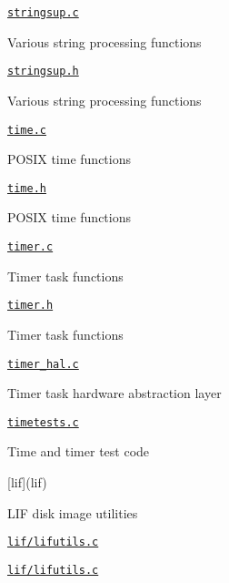\begin{DoxyItemize}
\begin{DoxyItemize}
\item \href{lib/stringsup.c}{\tt stringsup.\+c}
\begin{DoxyItemize}
\item Various string processing functions
\end{DoxyItemize}
\item \href{lib/stringsup.h}{\tt stringsup.\+h}
\begin{DoxyItemize}
\item Various string processing functions
\end{DoxyItemize}
\item \href{lib/time.c}{\tt time.\+c}
\begin{DoxyItemize}
\item P\+O\+S\+IX time functions
\end{DoxyItemize}
\item \href{lib/time.h}{\tt time.\+h}
\begin{DoxyItemize}
\item P\+O\+S\+IX time functions
\end{DoxyItemize}
\item \href{lib/timer.c}{\tt timer.\+c}
\begin{DoxyItemize}
\item Timer task functions
\end{DoxyItemize}
\item \href{lib/timer.h}{\tt timer.\+h}
\begin{DoxyItemize}
\item Timer task functions
\end{DoxyItemize}
\item \href{lib/timer_hal.c}{\tt timer\+\_\+hal.\+c}
\begin{DoxyItemize}
\item Timer task hardware abstraction layer
\end{DoxyItemize}
\item \href{lib/timetests.c}{\tt timetests.\+c}
\begin{DoxyItemize}
\item Time and timer test code
\end{DoxyItemize}
\end{DoxyItemize}
\item \mbox{[}lif\mbox{]}(lif)
\begin{DoxyItemize}
\item L\+IF disk image utilities
\item \href{lif/lifutils.c}{\tt lif/lifutils.\+c}
\item \href{lif/lifutils.c}{\tt lif/lifutils.\+c}

\end{DoxyItemize}
\end{DoxyItemize}
